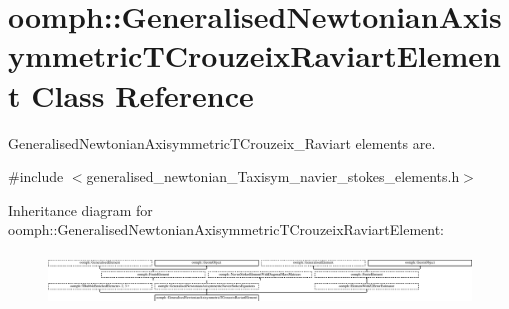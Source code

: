 \hypertarget{classoomph_1_1GeneralisedNewtonianAxisymmetricTCrouzeixRaviartElement}{}\section{oomph\+:\+:Generalised\+Newtonian\+Axisymmetric\+T\+Crouzeix\+Raviart\+Element Class Reference}
\label{classoomph_1_1GeneralisedNewtonianAxisymmetricTCrouzeixRaviartElement}


Generalised\+Newtonian\+Axisymmetric\+T\+Crouzeix\+\_\+\+Raviart elements are.  




{\ttfamily \#include $<$generalised\+\_\+newtonian\+\_\+\+Taxisym\+\_\+navier\+\_\+stokes\+\_\+elements.\+h$>$}

Inheritance diagram for oomph\+:\+:Generalised\+Newtonian\+Axisymmetric\+T\+Crouzeix\+Raviart\+Element\+:\begin{figure}[H]
\begin{center}
\leavevmode
\includegraphics[height=1.382716cm]{classoomph_1_1GeneralisedNewtonianAxisymmetricTCrouzeixRaviartElement}
\end{center}
\end{figure}
